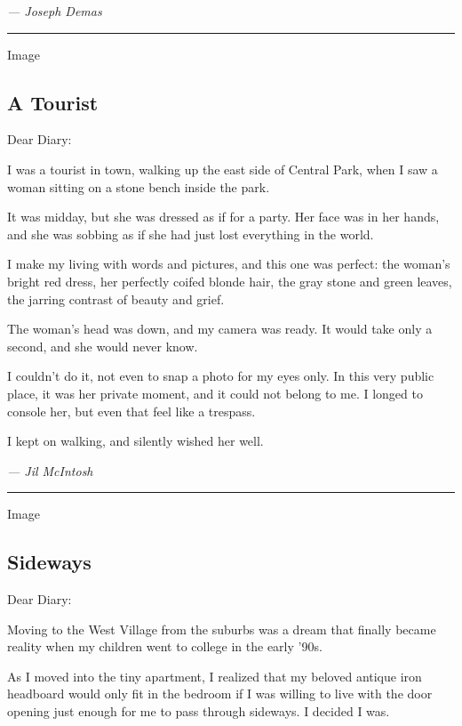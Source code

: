 \emph{--- Joseph Demas}

\begin{center}\rule{0.5\linewidth}{\linethickness}\end{center}

Image

\hypertarget{a-tourist}{%
\subsection{A Tourist}\label{a-tourist}}

Dear Diary:

I was a tourist in town, walking up the east side of Central Park, when
I saw a woman sitting on a stone bench inside the park.

It was midday, but she was dressed as if for a party. Her face was in
her hands, and she was sobbing as if she had just lost everything in the
world.

I make my living with words and pictures, and this one was perfect: the
woman's bright red dress, her perfectly coifed blonde hair, the gray
stone and green leaves, the jarring contrast of beauty and grief.

The woman's head was down, and my camera was ready. It would take only a
second, and she would never know.

I couldn't do it, not even to snap a photo for my eyes only. In this
very public place, it was her private moment, and it could not belong to
me. I longed to console her, but even that feel like a trespass.

I kept on walking, and silently wished her well.

\emph{--- Jil McIntosh}

\begin{center}\rule{0.5\linewidth}{\linethickness}\end{center}

Image

\hypertarget{sideways}{%
\subsection{Sideways}\label{sideways}}

Dear Diary:

Moving to the West Village from the suburbs was a dream that finally
became reality when my children went to college in the early '90s.

As I moved into the tiny apartment, I realized that my beloved antique
iron headboard would only fit in the bedroom if I was willing to live
with the door opening just enough for me to pass through sideways. I
decided I was.

